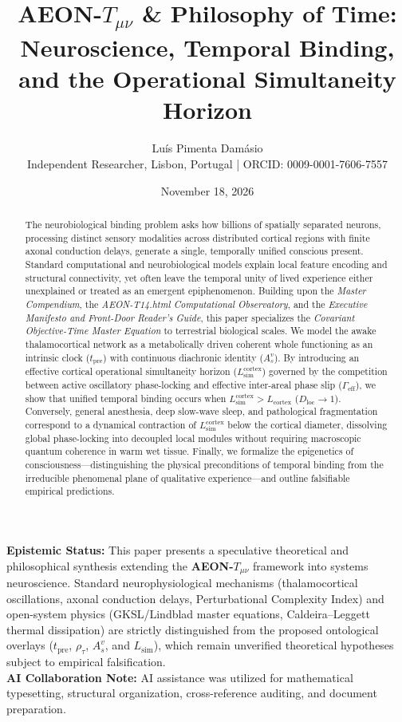 \documentclass[11pt,a4paper]{article}
\title{\textbf{AEON-$T_{\mu\nu}$ \& Philosophy of Time: Neuroscience, Temporal Binding, and the Operational Simultaneity Horizon}}
\author{Luís Pimenta Damásio \\ \small Independent Researcher, Lisbon, Portugal \quad | \quad ORCID: 0009-0001-7606-7557}
\date{November 18, 2026}
\begin{document}
\maketitle

\begin{tcolorbox}[colback=gray!6, colframe=gray!65!black, title=\textbf{Epistemic Status \& AI Collaboration Disclosure}]
\small
\textbf{Epistemic Status:} This paper presents a speculative theoretical and philosophical synthesis extending the \textbf{AEON-$T_{\mu\nu}$} framework into systems neuroscience. Standard neurophysiological mechanisms (thalamocortical oscillations, axonal conduction delays, Perturbational Complexity Index) and open-system physics (GKSL/Lindblad master equations, Caldeira--Leggett thermal dissipation) are strictly distinguished from the proposed ontological overlays ($t_{\mathrm{pre}}$, $\rho_\tau$, $A_s^v$, and $L_{\mathrm{sim}}$), which remain unverified theoretical hypotheses subject to empirical falsification.\\[4pt]
\textbf{AI Collaboration Note:} AI assistance was utilized for mathematical typesetting, structural organization, cross-reference auditing, and document preparation.
\end{tcolorbox}

\begin{abstract}
\noindent The neurobiological binding problem asks how billions of spatially separated neurons, processing distinct sensory modalities across distributed cortical regions with finite axonal conduction delays, generate a single, temporally unified conscious present. Standard computational and neurobiological models explain local feature encoding and structural connectivity, yet often leave the temporal unity of lived experience either unexplained or treated as an emergent epiphenomenon. Building upon the \emph{Master Compendium}, the \emph{AEON-T14.html Computational Observatory}, and the \emph{Executive Manifesto and Front-Door Reader's Guide}, this paper specializes the \emph{Covariant Objective-Time Master Equation} to terrestrial biological scales. We model the awake thalamocortical network as a metabolically driven coherent whole functioning as an intrinsic clock ($t_{\mathrm{pre}}$) with continuous diachronic identity ($A_s^v$). By introducing an effective cortical operational simultaneity horizon ($L_{\mathrm{sim}}^{\mathrm{cortex}}$) governed by the competition between active oscillatory phase-locking and effective inter-areal phase slip ($\Gamma_{\mathrm{eff}}$), we show that unified temporal binding occurs when $L_{\mathrm{sim}}^{\mathrm{cortex}} > L_{\mathrm{cortex}}$ ($D_{\mathrm{loc}} \to 1$). Conversely, general anesthesia, deep slow-wave sleep, and pathological fragmentation correspond to a dynamical contraction of $L_{\mathrm{sim}}^{\mathrm{cortex}}$ below the cortical diameter, dissolving global phase-locking into decoupled local modules without requiring macroscopic quantum coherence in warm wet tissue. Finally, we formalize the epigenetics of consciousness—distinguishing the physical preconditions of temporal binding from the irreducible phenomenal plane of qualitative experience—and outline falsifiable empirical predictions.
\end{abstract}
\end{document}
